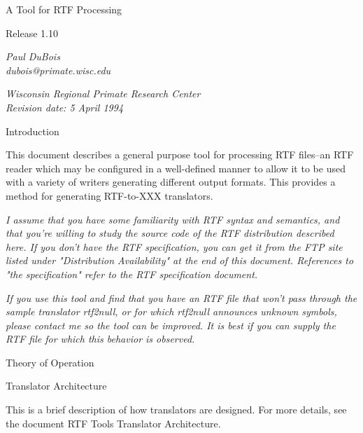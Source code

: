 \documentclass{article}
\begin{document}
\begin{center}
\noindent
A Tool for RTF Processing



\noindent
Release 1.10



\noindent
{\em Paul DuBois\\
dubois@primate.wisc.edu



\noindent
{\em Wisconsin Regional Primate Research Center\\
Revision date:  5 April 1994



}}
\end{center}

\noindent
Introduction






\noindent
This document describes a general purpose tool for processing RTF files--an 
RTF reader which may be configured in a well-defined manner to allow it to 
be used with a variety of writers generating different output formats. This 
provides a method for generating RTF-to-XXX translators.



\noindent
{\em I assume that you have some familiarity with RTF syntax and semantics, 
and that you're willing to study the source code of the RTF distribution 
described here. If you don't have the RTF specification, you can get it from 
the FTP site listed under "Distribution Availability" at the end of this 
document. References to "the specification" refer to the RTF specification 
document.



\noindent
{\em If you use this tool and find that you have an RTF file that won't pass 
through the sample translator rtf2null, or for which rtf2null announces unknown 
symbols, please contact me so the tool can be improved. It is best if you 
can supply the RTF file for which this behavior is observed.



}}
\noindent
Theory of Operation






\noindent
Translator Architecture






\noindent
This is a brief description of how translators are designed. For more details, 
see the document RTF Tools Translator Architecture.
\end{document}
